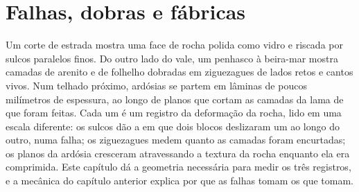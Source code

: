 \chapter{Falhas, dobras e fábricas}\label{ch:b1:faults-folds-fabrics}

Um corte de estrada mostra uma face de rocha polida como vidro e riscada por sulcos paralelos finos. Do outro lado do vale, um penhasco à beira-mar mostra camadas de arenito e de folhelho dobradas em ziguezagues de lados retos e cantos vivos. Num telhado próximo, ardósias se partem em lâminas de poucos milímetros de espessura, ao longo de planos que cortam as camadas da lama de que foram feitas. Cada um é um registro da deformação da rocha, lido em uma escala diferente: os sulcos dão a  em que dois blocos deslizaram um ao longo do outro, numa falha; os ziguezagues medem quanto as camadas foram encurtadas; os planos da ardósia cresceram atravessando a textura da rocha enquanto ela era comprimida. Este capítulo dá a geometria necessária para medir os três registros, e a mecânica do capítulo anterior explica por que as falhas tomam os  que tomam.

